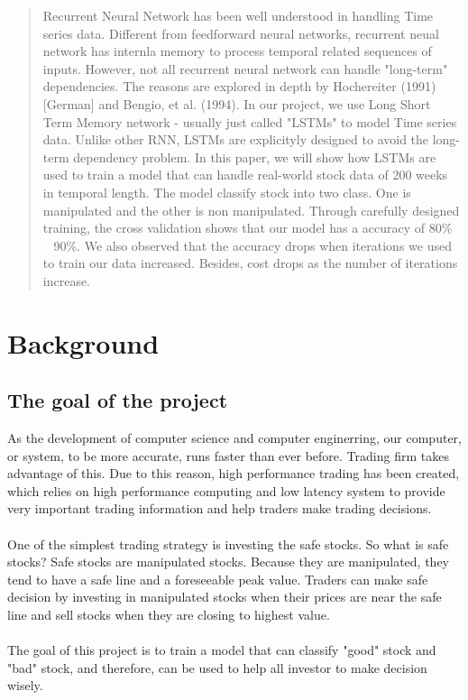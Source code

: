 \documentclass[12pt]{article}
\begin{document}
\maketitle


\begin{abstract}
Recurrent Neural Network has been well understood in handling
Time series data. Different from feedforward neural networks,
recurrent neual network has internla memory to process temporal
related sequences of inputs. However, not all recurrent neural network
can handle "long-term" dependencies. The reasons are explored in depth
by Hochereiter (1991) [German] and Bengio, et al. (1994). In our project, we
use Long Short Term Memory network - usually just called "LSTMs" to model
Time series data. Unlike other RNN, LSTMs are explicityly designed to avoid the
long-term dependency problem. In this paper, we will show how LSTMs are used
to train a model that can handle real-world stock data of 200 weeks in temporal length.
The model classify stock into two class. One is manipulated and the other is
non manipulated. Through carefully designed training, the cross validation
shows that our model has a accuracy of 80\% ~ 90\%. We also observed that
the accuracy drops when iterations we used to train our data increased.
Besides, cost drops as the number of iterations increase.
\end{abstract}



\section{Background}

\subsection{The goal of the project}
As the development of computer science and computer enginerring, our computer, or
system, to be more accurate, runs faster than ever before. Trading firm takes advantage of
this. Due to this reason, high performance trading has been created, which relies on high
performance computing and low latency system to provide very important trading information
and help traders make trading decisions. \\\\
One of the simplest trading strategy is investing the safe stocks. So what is safe stocks?
Safe stocks are manipulated stocks. Because they are manipulated, they tend to have a safe line
and a foreseeable peak value. Traders can make safe decision by investing in manipulated stocks
when their prices are near the safe line and sell stocks when they are closing to highest value. \\\\
The goal of this project is to train a model that can classify "good" stock and "bad" stock, and therefore,
can be used to help all investor to make decision wisely.
\end{document}
